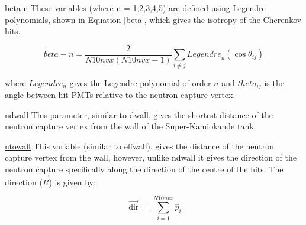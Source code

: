 \underline{beta-n}
\newline
These variables (where n = 1,2,3,4,5) are defined using Legendre polynomials, shown in Equation \ref{beta}, which gives the isotropy of the Cherenkov hits.

\begin{equation}
\label{beta}
 beta- n=\frac{2}{N 10 {nvx}(N 10 {nvx}-1)} \sum_{i \neq j}  { Legendre }_{n}\left(\cos \theta_{i j}\right)
\end{equation}

where $Legendre_n$ gives the Legendre polynomial of order $n$ and $theta_{ij}$ is the angle between hit PMTs relative to the neutron capture vertex.



\underline{ndwall}
\newline
This parameter, similar to dwall, gives the shortest distance of the neutron capture vertex from the wall of the Super-Kamiokande tank.
\newline



\underline{ntowall}
\newline
This variable (similar to effwall), gives the distance of the neutron capture vertex from the wall, however, unlike ndwall it gives the direction of the neutron capture specifically along the direction of the centre of the hits. The direction ($\overrightarrow{R}$) is given by:

\begin{equation}
\overrightarrow{\operatorname{dir}}=\sum_{i=1}^{N 10 n v x} \hat{p}_{i}
\end{equation}





